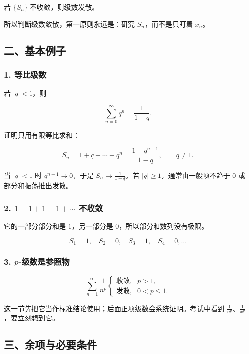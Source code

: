 若 \(\{S_n\}\) 不收敛，则级数发散。

\begin{notebox}
所以判断级数敛散，第一原则永远是：研究 \(S_n\)，而不是只盯着 \(x_n\)。
\end{notebox}

\subsection*{二、基本例子}

\subsubsection*{1. 等比级数}

若 \(|q|<1\)，则

\[
      \sum_{n=0}^{\infty}q^n=\frac{1}{1-q}.
    \]

证明只用有限等比求和：

\[
      S_n=1+q+\cdots+q^n=\frac{1-q^{n+1}}{1-q},
      \qquad q\ne1.
    \]

当 \(|q|<1\) 时 \(q^{n+1}\to0\)，于是 \(S_n\to \frac1{1-q}\)。若 \(|q|\ge1\)，通常由一般项不趋于 \(0\) 或部分和振荡推出发散。

\subsubsection*{2. \(1-1+1-1+\cdots\) 不收敛}

它的一部分部分和是 \(1\)，另一部分是 \(0\)，所以部分和数列没有极限。

\[
      S_1=1,\quad S_2=0,\quad S_3=1,\quad S_4=0,\ldots
    \]

\subsubsection*{3. \(p\)-级数是参照物}

\[
      \sum_{n=1}^{\infty}\frac1{n^p}
      \begin{cases}
      \text{收敛}, & p>1,\\
      \text{发散}, & 0<p\le1.
      \end{cases}
    \]

这一节先把它当作标准结论使用；后面正项级数会系统证明。考试中看到 \(\frac1{n^p}\)、\(\frac1{x^p}\)，要立刻想到它。

\subsection*{三、余项与必要条件}

